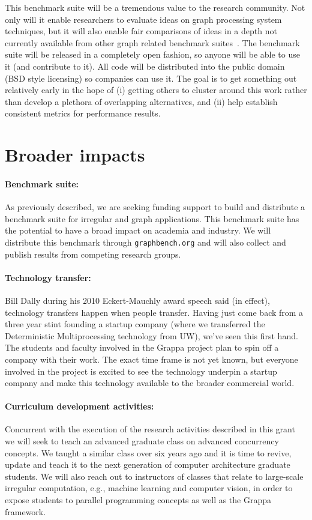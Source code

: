 This benchmark suite will be a tremendous value to the research community. Not only will it enable researchers to evaluate ideas on graph processing system techniques, but it will also enable fair comparisons of ideas in a depth not currently available from other graph related benchmark suites~\cite{graph500}. The benchmark suite will be released in a completely open fashion, so anyone will be able to use it (and contribute to it).  All code will be distributed into the public domain (BSD style licensing) so companies can use it. The goal is to get something out relatively early in the hope of (i) getting others to cluster around this work rather than develop a plethora of overlapping alternatives, and (ii) help establish consistent metrics for performance results.

\section{Broader impacts}

\paragraph{Benchmark suite:} As previously described, we are seeking funding support to build and distribute a benchmark suite for irregular and graph applications.  This benchmark suite has the potential to have a broad impact on academia and industry.  We will distribute this benchmark through \texttt{graphbench.org} and will also collect and publish results from competing research groups.

\paragraph{Technology transfer:} Bill Dally during his 2010 Eckert-Mauchly award speech said (in effect), technology transfers happen when people transfer.  Having just come back from a three year stint founding a startup company (where we transferred the Deterministic Multiprocessing technology from UW), we've seen this first hand.  The students and faculty involved in the Grappa project plan to spin off a company with their work.  The exact time frame is not yet known, but everyone involved in the project is excited to see the technology underpin a startup company and make this technology available to the broader commercial world.

\paragraph{Curriculum development activities:} Concurrent with the execution of the research activities described in this grant we will seek to teach an advanced graduate class on advanced concurrency concepts.  We taught a similar class over six years ago and it is time to revive, update and teach it to the next generation of computer architecture graduate students. We will also reach out to instructors of classes that relate to large-scale irregular computation, e.g., machine learning and computer vision, in order to expose students to parallel programming concepts as well as the Grappa framework. 

